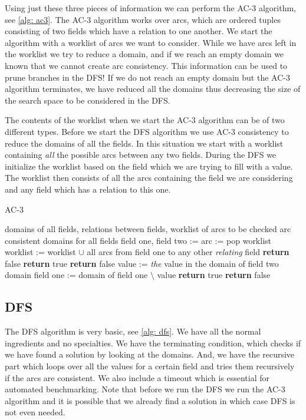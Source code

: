 \documentclass[a4paper]{article}
\begin{document}
Using just these three pieces of information we can perform the AC-3 algorithm,
see \ref{alg: ac3}. The AC-3 algorithm works over arcs, which are ordered
tuples consisting of two fields which have a relation to one another. We start
the algorithm with a worklist of arcs we want to consider. While we have arcs
left in the worklist we try to reduce a domain, and if we reach an empty domain
we known that we cannot create arc consistency. This information can be used to
prune branches in the DFS! If we do not reach an empty domain but the AC-3
algorithm terminates, we have reduced all the domains thus decreasing the size
of the search space to be considered in the DFS.

The contents of the worklist when we start the AC-3 algorithm can be of two
different types. Before we start the DFS algorithm we use AC-3 consistency to
reduce the domains of all the fields. In this situation we start with a
worklist containing \textit{all} the possible arcs between any two fields.
During the DFS we initialize the worklist based on the field which we are
trying to fill with a value. The worklist then consists of all the arcs
containing the field we are considering and any field which has a relation to
this one.

\begin{algorithm}
	\caption{AC-3}
	\label{alg: ac3}
	\begin{algorithmic}[1]
		\Require domains of all fields, relations between fields, worklist of arcs to be checked
		\Ensure arc consistent domains for all fields
				\State field one, field two := arc := pop worklist
						\State worklist := worklist $\cup$ all arcs from field
						one to any other \textit{relating} field
					\Else
						\State \textbf{return} false
					\EndIf
				\EndIf
			\EndWhile
			\State \textbf{return} true
		\EndFunction
				\State \textbf{return} false
			\EndIf
			\State value := \textit{the} value in the domain of field two
				\State domain field one := domain of field one $\setminus$ value
				\State \textbf{return} true
			\EndIf
			\State \textbf{return} false
		\EndFunction
	\end{algorithmic}
\end{algorithm}

\subsection{DFS}
The DFS algorithm is very basic, see \ref{alg: dfs}. We have all the normal
ingredients and no specialties. We have the terminating condition, which checks
if we have found a solution by looking at the domains. And, we have the
recursive part which loops over all the values for a certain field and tries
them recursively if the arcs are consistent. We also include a timeout which is
essential for automated benchmarking. Note that before we run the DFS we run
the AC-3 algorithm and it is possible that we already find a solution in which
case DFS is not even needed.
\end{document}
